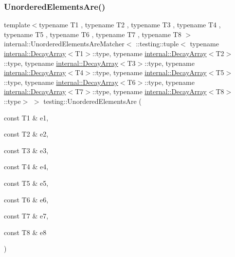 \subsubsection{\texorpdfstring{UnorderedElementsAre()}{UnorderedElementsAre()}\hspace{0.1cm}{\footnotesize\ttfamily [9/11]}}
{\footnotesize\ttfamily template$<$typename T1 , typename T2 , typename T3 , typename T4 , typename T5 , typename T6 , typename T7 , typename T8 $>$ \\
internal\+::\+Unordered\+Elements\+Are\+Matcher$<$ \+::testing\+::tuple$<$ typename \mbox{\hyperlink{structtesting_1_1internal_1_1DecayArray}{internal\+::\+Decay\+Array}}$<$T1$>$\+::type, typename \mbox{\hyperlink{structtesting_1_1internal_1_1DecayArray}{internal\+::\+Decay\+Array}}$<$T2$>$\+::type, typename \mbox{\hyperlink{structtesting_1_1internal_1_1DecayArray}{internal\+::\+Decay\+Array}}$<$T3$>$\+::type, typename \mbox{\hyperlink{structtesting_1_1internal_1_1DecayArray}{internal\+::\+Decay\+Array}}$<$T4$>$\+::type, typename \mbox{\hyperlink{structtesting_1_1internal_1_1DecayArray}{internal\+::\+Decay\+Array}}$<$T5$>$\+::type, typename \mbox{\hyperlink{structtesting_1_1internal_1_1DecayArray}{internal\+::\+Decay\+Array}}$<$T6$>$\+::type, typename \mbox{\hyperlink{structtesting_1_1internal_1_1DecayArray}{internal\+::\+Decay\+Array}}$<$T7$>$\+::type, typename \mbox{\hyperlink{structtesting_1_1internal_1_1DecayArray}{internal\+::\+Decay\+Array}}$<$T8$>$\+::type$>$ $>$ testing\+::\+Unordered\+Elements\+Are (\begin{DoxyParamCaption}\item[{const T1 \&}]{e1,  }\item[{const T2 \&}]{e2,  }\item[{const T3 \&}]{e3,  }\item[{const T4 \&}]{e4,  }\item[{const T5 \&}]{e5,  }\item[{const T6 \&}]{e6,  }\item[{const T7 \&}]{e7,  }\item[{const T8 \&}]{e8 }\end{DoxyParamCaption})\hspace{0.3cm}{\ttfamily [inline]}}

\mbox{\label{namespacetesting_a2e03e363e193ef512bf9fa964c484375}} 
